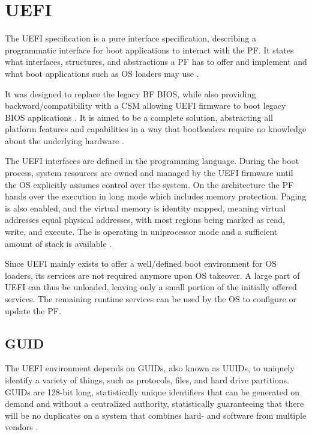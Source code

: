 
\section{\acf{UEFI}}

The \ac{UEFI} specification is a pure interface specification, describing a programmatic interface for boot applications to interact with the \ac{PF}.
It states what interfaces, structures, and abstractions a \ac{PF} has to offer and implement and what boot applications such as \ac{OS} loaders may use \cite{beyond-bios}.

It was designed to replace the legacy \acl{BF} \ac{BIOS}, while also providing backward\-/compatibility with a \acf{CSM} allowing \ac{UEFI} firmware to boot legacy \ac{BIOS} applications \cite{beyond-bios}.
It is aimed to be a complete solution, abstracting all platform features and capabilities in a way that bootloaders require no knowledge about the underlying hardware \cite[1.3]{uefi-spec}.

The \ac{UEFI} interfaces are defined in the  programming language.
During the boot process, system resources are owned and managed by the \ac{UEFI} firmware until the \ac{OS} explicitly assumes control over the system.
On the   architecture the \ac{PF} hands over the execution in  long mode which includes memory protection.
Paging is also enabled, and the virtual memory is identity mapped, meaning virtual addresses equal physical addresses, with most regions being marked as read, write, and execute.
The  is operating in uniprocessor mode and a sufficient amount of stack is available \cite[Section 2.3.4]{uefi-spec}.

Since \ac{UEFI} mainly exists to offer a well\-/defined boot environment for \ac{OS} loaders, its services are not required anymore upon \ac{OS} takeover.
A large part of \ac{UEFI} can thus be unloaded, leaving only a small portion of the initially offered services.
The remaining runtime services can be used by the \ac{OS} to configure or update the \ac{PF}.

\subsection{\acf{GUID}}

The \ac{UEFI} environment depends on \acp{GUID}, also known as \acp{UUID}, to uniquely identify a variety of things, such as protocols, files, and hard drive partitions.
\acp{GUID} are 128-bit long, statistically unique identifiers that can be generated on demand and without a centralized authority, statistically guaranteeing that there will be no duplicates on a system that combines hard- and software from multiple vendors \cite{rfc-4122}.

